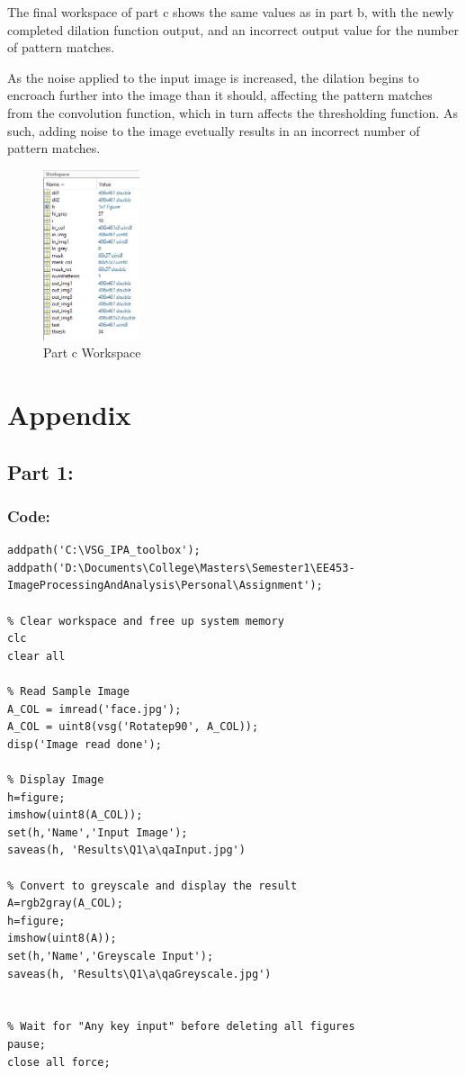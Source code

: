 \documentclass[a4paper]{article}
\begin{document}
	The final workspace of part c shows the same values as in part b, with
	the newly completed dilation function output, and an incorrect output
	value for the number of pattern matches.
	\par As the noise applied to the input image is increased, the dilation
	begins to encroach further into the image than it should, affecting the
	pattern matches from the convolution function, which in turn affects the
	thresholding function. As such, adding noise to the image evetually results
	in an incorrect number of pattern matches.
	\begin{figure}[H]
		\centering
		\includegraphics[height=5cm]{Results/Q3/c/Workspace.jpg}%
		\caption{Part c Workspace}
		\label{fig:}
	\end{figure}
	\section{Appendix}
	\subsection{Part 1:}
	\subsubsection{Code:}
	\begin{lstlisting}[caption={Part 1 a}]
	% Setup Paths to VSG Toolbox and Local Data
addpath('C:\VSG_IPA_toolbox');
addpath('D:\Documents\College\Masters\Semester1\EE453-ImageProcessingAndAnalysis\Personal\Assignment');

% Clear workspace and free up system memory
clc
clear all

% Read Sample Image
A_COL = imread('face.jpg');
A_COL = uint8(vsg('Rotatep90', A_COL));
disp('Image read done');

% Display Image
h=figure;
imshow(uint8(A_COL));
set(h,'Name','Input Image');
saveas(h, 'Results\Q1\a\qaInput.jpg')

% Convert to greyscale and display the result
A=rgb2gray(A_COL);
h=figure;
imshow(uint8(A));
set(h,'Name','Greyscale Input');
saveas(h, 'Results\Q1\a\qaGreyscale.jpg')


% Wait for "Any key input" before deleting all figures
pause;
close all force;
\end{lstlisting}
\end{document}

